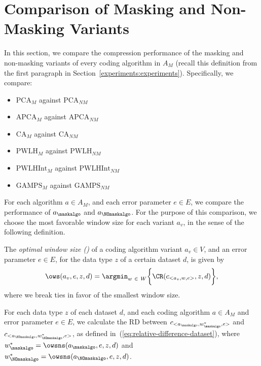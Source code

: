 
\clearpage
\section{Comparison of Masking and Non-Masking Variants}
\label{secX:rendimiento-relativo}


In this section, we compare the compression performance of the masking and non-masking variants of every coding algorithm in $A_M$ (recall this definition from the first paragraph in Section~\ref{experiments:experiments}). Specifically, we compare:


\vspace{-6pt}
\newcommand{\against}[1]{$\text{{#1}}_\textit{M}$ against $\text{{#1}}_\textit{NM}$}
\begin{itemize}
    \item \against{PCA}
    \item \against{APCA}
    \item \against{CA}
    \item \against{PWLH}
    \item \against{PWLHInt}
    \item \against{GAMPS}
\end{itemize}


\vspace{+3pt}
For each algorithm $a \in A_M$, and each error parameter $e \in E$, we compare the performance of $a_\maskalgo$ and $a_\NOmaskalgo$. For the purpose of this comparison, we choose the most favorable window size for each variant $a_v$, in the sense of the following definition.


\vspace{+5pt}
\begin{defcion}
\label{def:ows}
The \textit{optimal window size (\owsit)} of a coding algorithm variant $a_v \in V$, and an error parameter $e \in E$, for the data type $z$ of a certain dataset $d$, is given by
\begin{equation}
\label{eq:ows}
\ows(a_v, e, z, d) = \argmin_{w\ \in \ W} \biggl\{ \CR(c_{<a_v, w, e>}, z, d) \biggr\},
\end{equation}
where we break ties in favor of the smallest window size.
\end{defcion}


For each data type $z$ of each dataset $d$, and each coding algorithm $a \in A_M$ and error parameter $e \in E$, we calculate the RD between $c_{<a_\maskalgo, w_\maskalgo^{*}, e>}$ and $c_{<a_\NOmaskalgo, w_\NOmaskalgo^{*}, e>}$, as defined in~(\ref{eq:relative-difference-dataset}), where $w_\maskalgo^{*}=\owsns(a_\maskalgo, e, z, d)$ and $w_\NOmaskalgo^{*}=\owsns(a_\NOmaskalgo, e, z, d)$.



